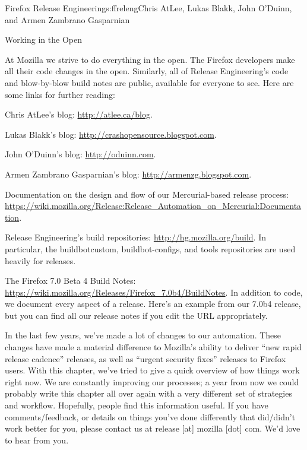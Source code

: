 \begin{aosachapter}{Firefox Release Engineering}{s:ffreleng}{Chris AtLee, Lukas Blakk, John O'Duinn, and Armen Zambrano Gasparnian}
\begin{aosasect1}{Working in the Open}

At Mozilla we strive to do everything in the open. The Firefox
developers make all their code changes in the open. Similarly, all of
Release Engineering's code and blow-by-blow build notes are public,
available for everyone to see.  Here are some links for further
reading:

\begin{aosaitemize}  

\item Chris AtLee's blog: \url{http://atlee.ca/blog}.

\item Lukas Blakk's blog: \url{http://crashopensource.blogspot.com}.

\item John O'Duinn's blog: \url{http://oduinn.com}.

\item Armen Zambrano Gasparnian's blog: \url{http://armenzg.blogspot.com}.

\item Documentation on the design and flow of our Mercurial-based release process: \url{https://wiki.mozilla.org/Release:Release\_Automation\_on\_Mercurial:Documentation}.

\item Release Engineering's build repositories:
  \url{http://hg.mozilla.org/build}.  In particular, the
  buildbotcustom, buildbot-configs, and tools repositories are used
  heavily for releases.

\item The Firefox 7.0 Beta 4 Build Notes:
  \url{https://wiki.mozilla.org/Releases/Firefox_7.0b4/BuildNotes}.
  In addition to code, we document every aspect of a release. Here's
  an example from our 7.0b4 release, but you can find all our release
  notes if you edit the URL appropriately.

\end{aosaitemize}

In the last few years, we've made a lot of changes to our automation.
These changes have made a material difference to Mozilla's ability to
deliver ``new rapid release cadence'' releases, as well as ``urgent
security fixes'' releases to Firefox users. With this chapter, we've
tried to give a quick overview of how things work right now. We are
constantly improving our processes; a year from now we could probably
write this chapter all over again with a very different set of
strategies and workflow. Hopefully, people find this information
useful. If you have comments/feedback, or details on things you've
done differently that did/didn't work better for you, please contact
us at release [at] mozilla [dot] com. We'd love to hear from you.
  
\end{aosasect1}

\end{aosachapter}
